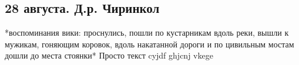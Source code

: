 \subsection{28 августа. Д.р. Чиринкол}
*воспоминания вики: проснулись, пошли по кустарникам вдоль реки, вышли к мужикам, гоняющим коровок, вдоль накатанной дороги и по цивильным мостам дошли до места стоянки*
Просто текст cyjdf ghjcnj vkege
\newpage